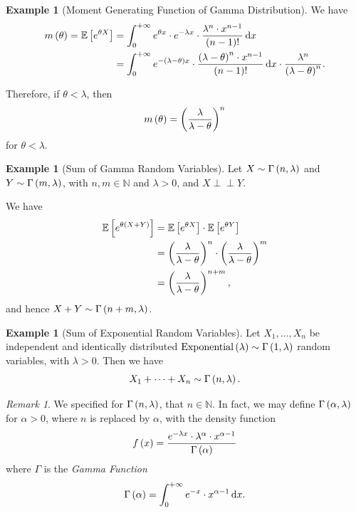 \documentclass{article}
\theoremstyle{definition}
\newtheorem{example}[theorem]{Example}
\theoremstyle{remark}
\newtheorem{remark}[theorem]{Remark}
\newcommand{\NN}{\mathbb{N}}
\newcommand{\Expt}{\mathbb{E}}
\newcommand{\plusinfty}{+\infty}
\newcommand{\indp}{\mathrel{\perp\!\!\!\perp}}
\newcommand{\Exponential}{\operatorname{Exponential}}
\begin{document}
\begin{example}[Moment Generating Function of Gamma Distribution]
    \label{ex:gamma-distribution-mgf}%
    We have
    \begin{align*}
        m\pqty{\theta} = \Expt\bqty{e^{\theta X}} &= \int_{0}^{\plusinfty} e^{\theta x} \cdot e^{- \lambda x} \cdot \frac{\lambda^n \cdot x^{n - 1}}{\pqty{n - 1}!} \dd{x} \\
        &= \int_{0}^{\plusinfty} e^{- \pqty{\lambda - \theta} x} \cdot \frac{\pqty{\lambda - \theta}^n \cdot x^{n - 1}}{\pqty{n - 1}!} \dd{x} \cdot \frac{\lambda^n}{\pqty{\lambda - \theta}^n}.
    \end{align*}

    Therefore, if \(\theta < \lambda\), then
    \[
        m \left(\theta\right) = \left(\frac{\lambda}{\lambda - \theta}\right)^n
    \]
    for \(\theta < \lambda\).
\end{example}

\begin{example}[Sum of Gamma Random Variables]
    \label{ex:sum-gamma}%
    Let \(X \sim \Gamma\left(n, \lambda\right)\) and \(Y \sim \Gamma\left(m, \lambda\right)\), with \(n, m \in \NN\) and \(\lambda > 0\), and \(X \indp Y\).

    We have
    \begin{align*}
        \Expt\bqty{e^{\theta \pqty{X + Y}}} &= \Expt\bqty{e^{\theta X}} \cdot \Expt\bqty{e^{\theta Y}} \\
        &= \pqty{\frac{\lambda}{\lambda - \theta}}^n \cdot \pqty{\frac{\lambda}{\lambda - \theta}}^m \\
        &= \pqty{\frac{\lambda}{\lambda - \theta}}^{n + m},
    \end{align*}
    and hence \(X + Y \sim \Gamma\left(n + m, \lambda\right)\).
\end{example}

\begin{example}[Sum of Exponential Random Variables]
    \label{ex:sum-exponential}%
    Let \(X_1, \ldots, X_n\) be independent and identically distributed \(\Exponential\pqty{\lambda} \sim \Gamma\pqty{1, \lambda}\) random variables, with \(\lambda > 0\). Then we have
    \[
        X_1 + \cdots + X_n \sim \Gamma\left(n, \lambda\right).
    \]
\end{example}

\begin{remark}
    We specified for \(\Gamma\left(n, \lambda\right)\), that \(n \in \NN\). In fact, we may define \(\Gamma\left(\alpha, \lambda\right)\) for \(\alpha > 0\), where \(n\) is replaced by \(\alpha\), with the density function
    \[
        f\left(x\right) = \frac{e^{-\lambda x} \cdot \lambda^{\alpha} \cdot x^{\alpha - 1}}{\Gamma\left(\alpha\right)}
    \]
    where \(\Gamma\) is the \emph{Gamma Function}
    \[
        \Gamma\pqty{\alpha} = \int_{0}^{\plusinfty} e^{-x} \cdot x^{\alpha - 1} \dd{x}.
    \]
\end{remark}
\end{document}
